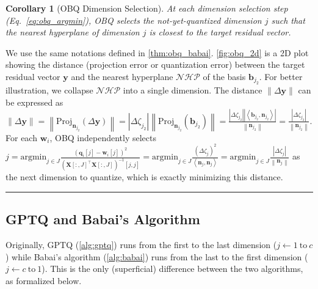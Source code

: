\documentclass{article} %
\newcommand{\BlackBox}{\rule{1.5ex}{1.5ex}}  %
\renewenvironment{proof}{\par\noindent{\bf Proof\ }}{\hfill\BlackBox\par}
\newenvironment{proof}{\par\noindent{\bf Proof\ }}{\hfill\BlackBox\par}
\newtheorem{corollary}[theorem]{Corollary}
\begin{document}
\begin{corollary}[OBQ Dimension Selection]
\label{thm:obq_babai_argmin}
At each dimension selection step (Eq.~\ref{eq:obq_argmin}), OBQ selects the not-yet-quantized dimension $j$ such that the nearest hyperplane of dimension $j$ is closest to the target residual vector.
\end{corollary}
\begin{proof}
We use the same notations defined in \cref{thm:obq_babai}.
\cref{fig:obq_2d} is a 2D plot showing the distance (projection error or quantization error) between the target residual vector $\bm{y}$ and the nearest hyperplane $\mathcal{NHP}$ of the basis $\bm{b}_{{j}_{2}}$. For better illustration, we collapse $\mathcal{NHP}$ into a single dimension.
The distance $\left\| \Delta \bm{y} \right\|$ can be expressed as $\left\| \Delta \bm{y} \right\|
= \left\| \mathrm{Proj}_{\bm{n}_{{j}_{2}}} \left( \Delta \bm{y} \right) \right\|
= \left| \Delta {\zeta}_{{j}_{2}} \right| \left\| \mathrm{Proj}_{\bm{n}_{{j}_{2}}} \left( \bm{b}_{{j}_{2}} \right) \right\|
= \frac{\left| \Delta {\zeta}_{{j}_{2}} \right| \left| \left< \bm{b}_{{j}_{2}}, \bm{n}_{{j}_{2}} \right> \right|}{\left\| \bm{n}_{{j}_{2}} \right\|}
= \frac{\left| \Delta {\zeta}_{{j}_{2}} \right|}{\left\| \bm{n}_{{j}_{2}} \right\|}$.
For each $\bm{w}_{i}$, OBQ independently selects
$j = \mathrm{argmin}_{j \in J} \frac{\left( \bm{q}_{i} [j] - \bm{w}_{i} [j] \right)^{2}}{\left( \bm{X} [:, J]^{\top} \bm{X} [:, J] \right)^{-1} [j, j]}
= \mathrm{argmin}_{j \in J} \frac{\left( \Delta {\zeta}_{j} \right)^{2}}{\left< \bm{n}_{j} , \bm{n}_{j} \right>}
= \mathrm{argmin}_{j \in J} \frac{\left| \Delta {\zeta}_{j} \right|}{\left\| \bm{n}_{j} \right\|}
$ as the next dimension to quantize, which is exactly minimizing this distance.
\end{proof}

\subsection{GPTQ and Babai's Algorithm}
\label{sec:gptq_babai}

Originally, GPTQ (\cref{alg:gptq}) runs from the first to the last dimension ($j \leftarrow 1 \ \mathrm{to} \ c$) while Babai's algorithm (\cref{alg:babai}) runs from the last to the first dimension ($j \leftarrow c \ \mathrm{to} \ 1$).
This is the only (superficial) difference between the two algorithms, as formalized below.
\end{document}

